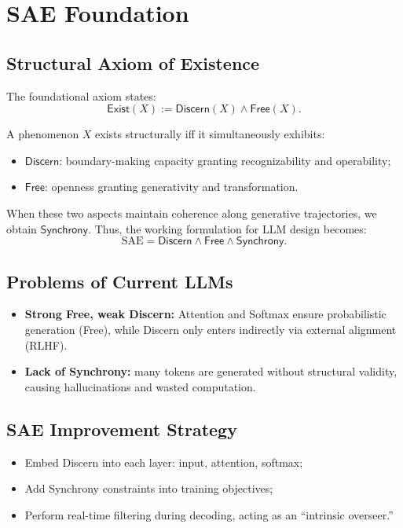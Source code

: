 \documentclass[11pt]{article}
\theoremstyle{plain}
\theoremstyle{definition}
\theoremstyle{remark}
\newcommand{\Exist}{\ensuremath{\mathsf{Exist}}}
\newcommand{\Discern}{\ensuremath{\mathsf{Discern}}}
\newcommand{\Free}{\ensuremath{\mathsf{Free}}}
\newcommand{\Synchrony}{\ensuremath{\mathsf{Synchrony}}}
\begin{document}
\section{SAE Foundation}

\subsection{Structural Axiom of Existence}

The foundational axiom states:
\[
\Exist(X) := \Discern(X) \wedge \Free(X).
\]

A phenomenon $X$ exists structurally iff it simultaneously exhibits:
\begin{itemize}
  \item \Discern: boundary-making capacity granting recognizability and operability;
  \item \Free: openness granting generativity and transformation.
\end{itemize}

When these two aspects maintain coherence along generative trajectories, we obtain \Synchrony{}.  
Thus, the working formulation for LLM design becomes:
\[
\text{SAE} = \Discern \wedge \Free \wedge \Synchrony.
\]


\subsection{Problems of Current LLMs}
\begin{itemize}
  \item \textbf{Strong Free, weak Discern:} Attention and Softmax ensure probabilistic generation (Free), while Discern only enters indirectly via external alignment (RLHF).
  \item \textbf{Lack of Synchrony:} many tokens are generated without structural validity, causing hallucinations and wasted computation.
\end{itemize}

\subsection{SAE Improvement Strategy}
\begin{itemize}
  \item Embed Discern into each layer: input, attention, softmax;
  \item Add Synchrony constraints into training objectives;
  \item Perform real-time filtering during decoding, acting as an ``intrinsic overseer.''
\end{itemize}
\end{document}
